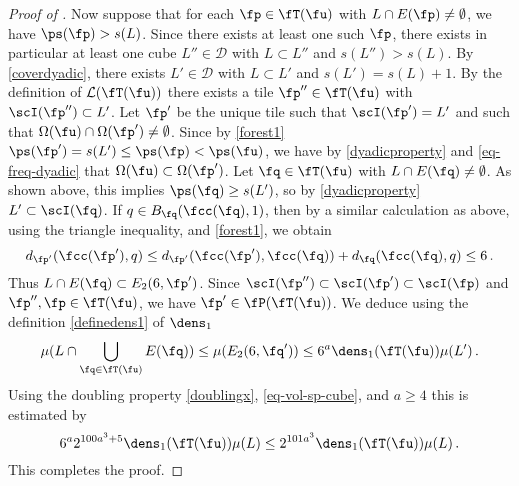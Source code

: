 \begin{proof}[Proof of ]
    Now suppose that for each $\fp \in \fT(\fu)$ with $L \cap E(\fp) \ne \emptyset$, we have $\ps(\fp) > s(L)$. Since there exists at least one such $\fp$, there exists in particular at least one cube $L'' \in \mathcal{D}$ with $L \subset L''$ and $s(L'') > s(L)$. By \eqref{coverdyadic}, there exists $L' \in \mathcal{D}$ with $L \subset L'$ and $s(L') = s(L) + 1$. By the definition of $\mathcal{L}(\fT(\fu))$ there exists a tile $\fp'' \in \fT(\fu)$ with $\scI(\fp'') \subset L'$. Let $\fp'$ be the unique tile such that $\scI(\fp') = L'$ and such that $\Omega(\fu) \cap \Omega(\fp') \ne \emptyset$. Since by \eqref{forest1} $\ps(\fp') = s(L') \le \ps(\fp) < \ps(\fu)$, we have by \eqref{dyadicproperty} and \eqref{eq-freq-dyadic} that $\Omega(\fu) \subset \Omega(\fp')$. Let $\fq \in \fT(\fu)$ with $L \cap E(\fq) \ne \emptyset$. As shown above, this implies $\ps(\fq) \ge s(L')$, so by \eqref{dyadicproperty} $L' \subset \scI(\fq)$. If $q \in B_{\fq}(\fcc(\fq), 1)$, then by a similar calculation as above, using the triangle inequality,  and \eqref{forest1}, we obtain
    $$
        d_{\fp'}(\fcc(\fp'), q) \le d_{\fp'}(\fcc(\fp'), \fcc(\fq)) + d_{\fq}(\fcc(\fq), q) \le 6\,.
    $$
    Thus $L \cap E(\fq) \subset E_2(6, \fp')$. Since $\scI(\fp'') \subset \scI(\fp') \subset \scI(\fp)$ and $\fp'', \fp \in \fT(\fu)$, we have $\fp' \in \fP(\fT(\fu))$. We deduce using the definition \eqref{definedens1} of $\dens_1$
    $$
        \mu(L \cap \bigcup_{\fq \in \fT(\fu)} E(\fq)) \le \mu(E_2(6, \fq')) \le 6^a \dens_1(\fT(\fu)) \mu(L')\,.
    $$
    Using the doubling property \eqref{doublingx}, \eqref{eq-vol-sp-cube}, and $a \ge 4$ this is estimated by
    $$
        6^a 2^{100a^3 + 5}\dens_1(\fT(\fu)) \mu(L) \le 2^{101 a^3} \dens_1(\fT(\fu))\mu(L)\,.
    $$
    This completes the proof.
\end{proof}

